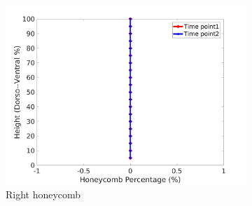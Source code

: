\begin{figure}[H]
\begin{subfigure}{.42\linewidth}
  \includegraphics[width=\linewidth,trim={{.0\wd0} {.0\wd0} {.0\wd0} {.0\wd0}},clip]{Appendix/Image_AppexA/DorsoToVentral/IPF10RightLungHoneycombDiseaseDorsoToVentral.jpg}
  \caption{Right honeycomb}
  \label{fig:IPF10DiseaseDorsoToVentral-f}
\end{subfigure}
\begin{subfigure}{.42\linewidth}%

\end{subfigure}
\end{figure}
